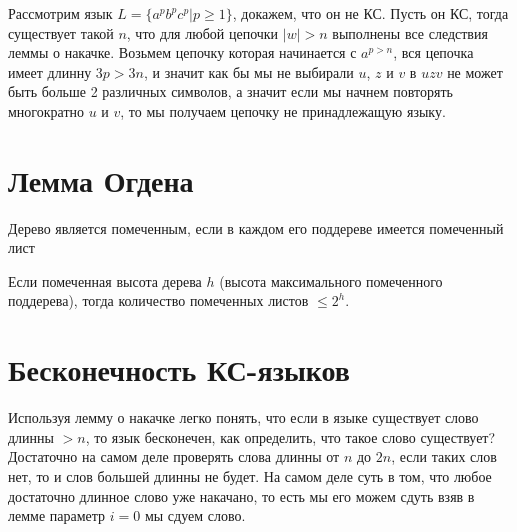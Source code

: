 Рассмотрим язык $L = \{a^pb^pc^p | p \ge 1\}$, докажем, что он не КС. Пусть он КС, тогда существует такой $n$, что для любой цепочки $|w| > n$ выполнены
все следствия леммы о накачке. Возьмем цепочку которая начинается с $a^{p>n}$, вся цепочка имеет длинну $3p > 3n$, и значит как бы мы не выбирали $u$, $z$ и
$v$ в $uzv$ не может быть больше 2 различных символов, а значит если мы начнем повторять многократно $u$ и $v$, то мы получаем цепочку не принадлежащую языку.

\section{Лемма Огдена}

\begin{Def}
Дерево является помеченным, если в каждом его поддереве имеется помеченный лист
\end{Def}

Если помеченная высота дерева $h$ (высота максимального помеченного поддерева), тогда количество помеченных листов $\le 2^h$.

\section{Бесконечность КС-языков}

Используя лемму о накачке легко понять, что если в языке существует слово длинны $>n$, то язык бесконечен, как определить, что такое слово существует? Достаточно
на самом деле проверять слова длинны от $n$ до $2n$, если таких слов нет, то и слов большей длинны не будет. На самом деле суть в том, что любое достаточно длинное
слово уже накачано, то есть мы его можем сдуть взяв в лемме параметр $i = 0$ мы сдуем слово.
